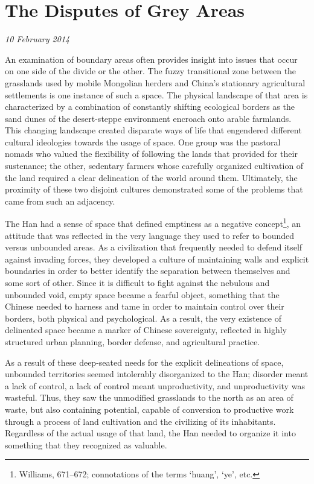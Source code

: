 \section{The Disputes of Grey Areas}

\textit{10 February 2014}

An examination of boundary areas often provides insight into issues that occur
on one side of the divide or the other. The fuzzy transitional zone between the
grasslands used by mobile Mongolian herders and China's stationary agricultural
settlements is one instance of such a space.  The physical landscape of that
area is characterized by a combination of constantly shifting ecological borders
as the sand dunes of the desert-steppe environment encroach onto arable
farmlands.  This changing landscape created disparate ways of life that
engendered different cultural ideologies towards the usage of space. One group
was the pastoral nomads who valued the flexibility of following the lands that
provided for their sustenance; the other, sedentary farmers whose carefully
organized cultivation of the land required a clear delineation of the world
around them. Ultimately, the proximity of these two disjoint cultures
demonstrated some of the problems that came from such an adjacency.

The Han had a sense of space that defined emptiness as a negative
concept\footnote{Williams, 671--672; connotations of the terms `huang', `ye',
etc.}, an attitude that was reflected in the very language they used to refer to
bounded versus unbounded areas. As a civilization that frequently needed to
defend itself against invading forces, they developed a culture of maintaining
walls and explicit boundaries in order to better identify the separation between
themselves and some sort of other. Since it is difficult to fight against the
nebulous and unbounded void, empty space became a fearful object, something that
the Chinese needed to harness and tame in order to maintain control over their
borders, both physical and psychological. As a result, the very existence of
delineated space became a marker of Chinese sovereignty, reflected in highly
structured urban planning, border defense, and agricultural practice.

As a result of  these deep-seated needs for the explicit delineations of space,
unbounded territories seemed intolerably disorganized to the Han; disorder meant
a lack of control, a lack of control meant unproductivity, and unproductivity
was wasteful.  Thus, they saw the unmodified grasslands to the north as an area
of waste, but also containing potential, capable of conversion to productive
work through a process of land cultivation and the civilizing of its
inhabitants.  Regardless of the actual usage of that land, the Han needed to
organize it into something that they recognized as valuable.

